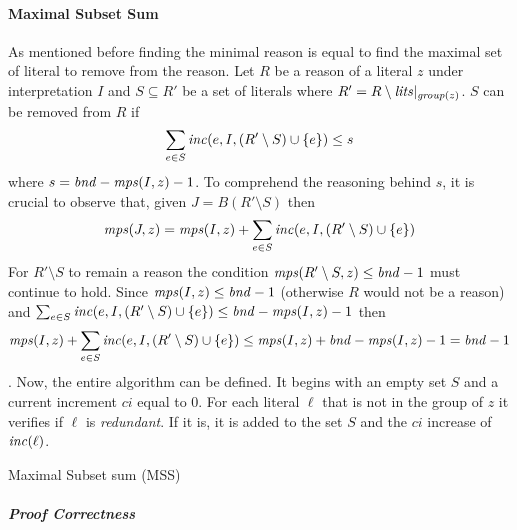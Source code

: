 \paragraph{Maximal Subset Sum}
As mentioned before finding the minimal reason is 
equal to find the maximal set of literal to remove from the reason.
Let $R$ be a reason of a literal $z$ under interpretation $I$ and
$S \subseteq R'$ be a set of literals where $R' = R\setminus\mathit{lits}|_{\mathit{group}(z)}$.
$S$ can be removed from $R$ if 
$$\sum_{e \in S}\mathit{inc}(e,I,(R'\setminus S) \cup \{e\}) \le s $$
where $s = \mathit{bnd} - \mathit{mps}(I,z) - 1$.
To comprehend the reasoning behind $s$, it is crucial to observe that, 
given $J = B(R'\setminus S)$ 
then $$\mathit{mps}(J,z) = \mathit{mps}(I,z) + \sum_{e \in S}\mathit{inc}(e,I,(R'\setminus S) \cup \{e\})$$
For $R'\setminus S$ to remain a reason
the condition $\mathit{mps}(R'\setminus S,z) \le \mathit{bnd} - 1$
must continue to hold.
Since $\mathit{mps}(I,z) \le \mathit{bnd} - 1 $ (otherwise $R$ would not be a reason)
and $\sum_{e \in S}\mathit{inc}(e,I,(R'\setminus S) \cup \{e\}) \le \mathit{bnd} - \mathit{mps}(I,z) - 1$
then $$\mathit{mps}(I,z) + 
\sum_{e \in S}\mathit{inc}(e,I,(R'\setminus S) \cup \{e\}) \le \mathit{mps}(I,z) + 
\mathit{bnd} - \mathit{mps}(I,z) - 1 = \mathit{bnd} - 1$$.
Now, the entire algorithm can be defined. 
It begins with an empty set $S$ and a current increment $ci$
equal to 0. For each literal $\ell$ that is not in the group 
of $z$ it verifies if $\ell$ is \textit{redundant}.
If it is, it is added to the set $S$ and the $ci$
increase of $\mathit{inc}(\ell)$. 
\begin{algorithm}[h]\small
    \caption{Maximal Subset sum (MSS)}
    \label{alg:maximal_subset}
\end{algorithm}

\subparagraph{Proof Correctness}

